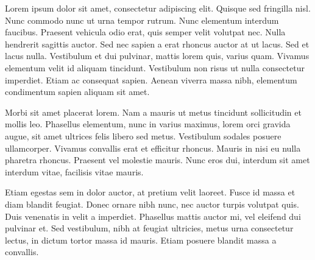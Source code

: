 \documentclass{ata-calico}
\begin{document}
\maketitle

Lorem ipsum dolor sit amet, consectetur adipiscing elit. Quisque sed fringilla nisl. Nunc commodo nunc ut urna tempor rutrum. Nunc elementum interdum faucibus. Praesent vehicula odio erat, quis semper velit volutpat nec. Nulla hendrerit sagittis auctor. Sed nec sapien a erat rhoncus auctor at ut lacus. Sed et lacus nulla. Vestibulum et dui pulvinar, mattis lorem quis, varius quam. Vivamus elementum velit id aliquam tincidunt. Vestibulum non risus ut nulla consectetur imperdiet. Etiam ac consequat sapien. Aenean viverra massa nibh, elementum condimentum sapien aliquam sit amet.

Morbi sit amet placerat lorem. Nam a mauris ut metus tincidunt sollicitudin et mollis leo. Phasellus elementum, nunc in varius maximus, lorem orci gravida augue, sit amet ultrices felis libero sed metus. Vestibulum sodales posuere ullamcorper. Vivamus convallis erat et efficitur rhoncus. Mauris in nisi eu nulla pharetra rhoncus. Praesent vel molestie mauris. Nunc eros dui, interdum sit amet interdum vitae, facilisis vitae mauris.

Etiam egestas sem in dolor auctor, at pretium velit laoreet. Fusce id massa et diam blandit feugiat. Donec ornare nibh nunc, nec auctor turpis volutpat quis. Duis venenatis in velit a imperdiet. Phasellus mattis auctor mi, vel eleifend dui pulvinar et. Sed vestibulum, nibh at feugiat ultricies, metus urna consectetur lectus, in dictum tortor massa id mauris. Etiam posuere blandit massa a convallis.

\end{document}
